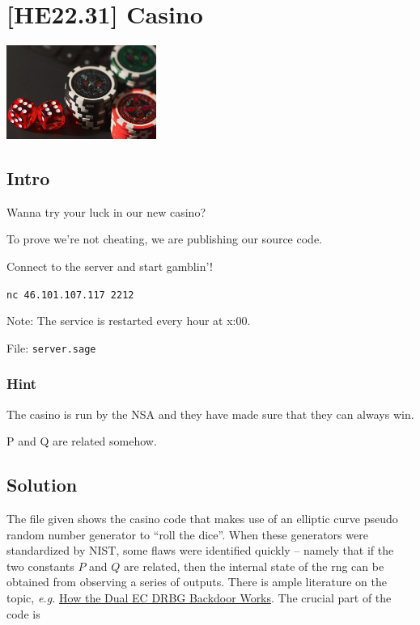 
\hypertarget{he22.31}{%
\chapter{[HE22.31] Casino}\label{he22.31}}

\begin{marginfigure}
	\includegraphics[width=49mm]{level7/challenge31.jpg}
\end{marginfigure}
\section{Intro}
Wanna try your luck in our new casino?

\noindent To prove we're not cheating, we are publishing our source code.

\noindent Connect to the server and start gamblin'!

\noindent \verb+nc 46.101.107.117 2212+

\noindent Note: The service is restarted every hour at x:00.

\noindent File: \verb+server.sage+
\subsection{Hint}
The casino is run by the NSA and they have made sure that they can always win.

\noindent P and Q are related somehow.

\section{Solution}\label{hv22.31solution}

The file given shows the casino code that makes use of an elliptic curve pseudo random number generator to ``roll the dice''.  When these generators were standardized by NIST, some flaws were identified quickly -- namely that if the two constants $P$ and $Q$ are related, then the internal state of the rng can be obtained from observing a series of outputs.   There is ample literature on the topic, \emph{e.g.} \href{http://bugcharmer.blogspot.com/2014/03/how-dual-ec-drbg-backdoor-works.html}{How the Dual EC DRBG Backdoor Works}.  The crucial part of the code is

